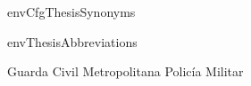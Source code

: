 \environment envCfgThesisSynonyms

\startenvironment envThesisAbbreviations

 {Guarda Civil Metropolitana}
 {Policía Militar}

\stopenvironment